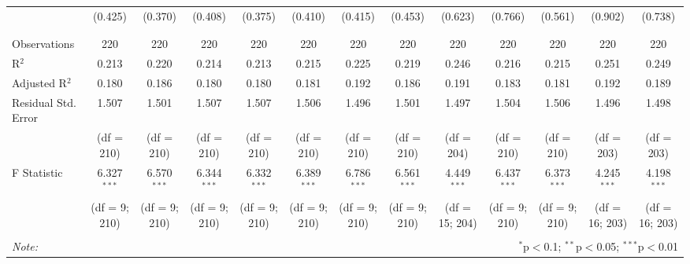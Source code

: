 \begin{table}[H]
\begin{adjustbox}{width=\textwidth}
\begin{tabular}{@{\extracolsep{5pt}}lcccccccccccc}
  & (0.425) & (0.370) & (0.408) & (0.375) & (0.410) & (0.415) & (0.453) & (0.623) & (0.766) & (0.561) & (0.902) & (0.738) \\ 
  & & & & & & & & & & & & \\ 
\hline \\[-1.8ex] 
Observations & 220 & 220 & 220 & 220 & 220 & 220 & 220 & 220 & 220 & 220 & 220 & 220 \\ 
R$^{2}$ & 0.213 & 0.220 & 0.214 & 0.213 & 0.215 & 0.225 & 0.219 & 0.246 & 0.216 & 0.215 & 0.251 & 0.249 \\ 
Adjusted R$^{2}$ & 0.180 & 0.186 & 0.180 & 0.180 & 0.181 & 0.192 & 0.186 & 0.191 & 0.183 & 0.181 & 0.192 & 0.189 \\ 
Residual Std. Error & 1.507 & 1.501 & 1.507  & 1.507  & 1.506  & 1.496  & 1.501  & 1.497  & 1.504  & 1.506  & 1.496  & 1.498 \\ 
& (df = 210) & (df = 210) & (df = 210) & (df = 210) & (df = 210) & (df = 210) & (df = 210) & (df = 204)& (df = 210) & (df = 210) & (df = 203) & (df = 203) \\
F Statistic & 6.327$^{***}$  & 6.570$^{***}$ & 6.344$^{***}$  & 6.332$^{***}$ & 6.389$^{***}$  & 6.786$^{***}$ & 6.561$^{***}$  & 4.449$^{***}$ & 6.437$^{***}$  & 6.373$^{***}$  & 4.245$^{***}$ & 4.198$^{***}$  \\ 
& (df = 9; 210) & (df = 9; 210) & (df = 9; 210) & (df = 9; 210) & (df = 9; 210) & (df = 9; 210) & (df = 9; 210) & (df = 15; 204) & (df = 9; 210) & (df = 9; 210) & (df = 16; 203) & (df = 16; 203) \\
\hline 
\hline \\[-1.8ex] 
\textit{Note:}  & \multicolumn{12}{r}{$^{*}$p$<$0.1; $^{**}$p$<$0.05; $^{***}$p$<$0.01} \\ 
\end{tabular} 
\end{adjustbox}
\end{table}
   
   

   
   

